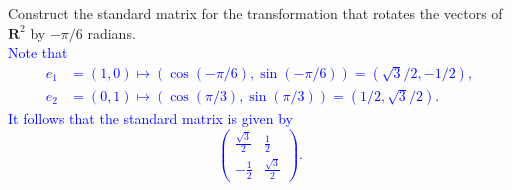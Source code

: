 \documentclass[a4paper,11pt]{article}
\newcommand{\R}{\mathbf{R}}
\newcommand{\BB}[1]{\textcolor{blue}{#1}}
\begin{document}
 Construct the standard matrix for the
transformation that rotates the vectors of $\R^2$ by $-\pi/6$ radians. \\

\BB{Note that
  \begin{align*}
    e_1&=(1,0) \mapsto (\cos(-\pi/6),\sin(-\pi/6))=(\sqrt{3}/2,-1/2), \\
    e_2&=(0,1) \mapsto (\cos(\pi/3),\sin(\pi/3))=(1/2,\sqrt{3}/2).
    \end{align*}
    It follows that the standard matrix is given by
    \[
      \left(
        \begin{array}{rr}
          \frac{\sqrt{3}}{2} & \frac{1}{2} \\
          -\frac{1}{2} & \frac{\sqrt{3}}{2}
        \end{array}
      \right).
    \] \\
}
\end{document}

